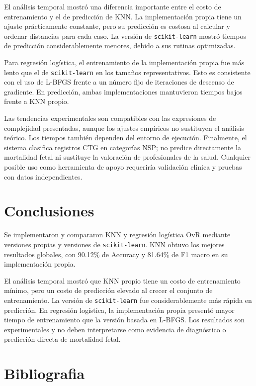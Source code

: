 \documentclass[10pt,a4paper,twocolumn]{article}
\begin{document}
El análisis temporal mostró una diferencia importante entre el costo de entrenamiento y el de predicción de KNN. La implementación propia tiene un ajuste prácticamente constante, pero su predicción es costosa al calcular y ordenar distancias para cada caso. La versión de \texttt{scikit-learn} mostró tiempos de predicción considerablemente menores, debido a sus rutinas optimizadas.

Para regresión logística, el entrenamiento de la implementación propia fue más lento que el de \texttt{scikit-learn} en los tamaños representativos. Esto es consistente con el uso de L-BFGS frente a un número fijo de iteraciones de descenso de gradiente. En predicción, ambas implementaciones mantuvieron tiempos bajos frente a KNN propio.

Las tendencias experimentales son compatibles con las expresiones de complejidad presentadas, aunque los ajustes empíricos no sustituyen el análisis teórico. Los tiempos también dependen del entorno de ejecución. Finalmente, el sistema clasifica registros CTG en categorías NSP; no predice directamente la mortalidad fetal ni sustituye la valoración de profesionales de la salud. Cualquier posible uso como herramienta de apoyo requeriría validación clínica y pruebas con datos independientes.

\section{Conclusiones}
Se implementaron y compararon KNN y regresión logística OvR mediante versiones propias y versiones de \texttt{scikit-learn}. KNN obtuvo los mejores resultados globales, con 90.12\% de Accuracy y 81.64\% de F1 macro en su implementación propia.

El análisis temporal mostró que KNN propio tiene un costo de entrenamiento mínimo, pero un costo de predicción elevado al crecer el conjunto de entrenamiento. La versión de \texttt{scikit-learn} fue considerablemente más rápida en predicción. En regresión logística, la implementación propia presentó mayor tiempo de entrenamiento que la versión basada en L-BFGS. Los resultados son experimentales y no deben interpretarse como evidencia de diagnóstico o predicción directa de mortalidad fetal.

\section{Bibliografia}

\begingroup
\setlength{\parindent}{0pt}
\setlength{\parskip}{6pt}
\end{document}
